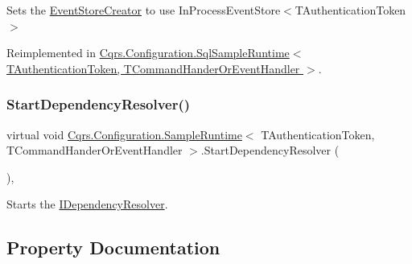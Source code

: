 Sets the \hyperlink{classCqrs_1_1Configuration_1_1SampleRuntime_a9038dd478bcafb2f5f65cbcbada712db_a9038dd478bcafb2f5f65cbcbada712db}{Event\+Store\+Creator} to use In\+Process\+Event\+Store$<$\+T\+Authentication\+Token$>$ 



Reimplemented in \hyperlink{classCqrs_1_1Configuration_1_1SqlSampleRuntime_ae2fedd0697e72a1283a098c809d832c9_ae2fedd0697e72a1283a098c809d832c9}{Cqrs.\+Configuration.\+Sql\+Sample\+Runtime$<$ T\+Authentication\+Token, T\+Command\+Hander\+Or\+Event\+Handler $>$}.

\mbox{\label{classCqrs_1_1Configuration_1_1SampleRuntime_a1593df9e75becc36fee1f15b2be14ec4_a1593df9e75becc36fee1f15b2be14ec4}} 
\subsubsection{\texorpdfstring{Start\+Dependency\+Resolver()}{StartDependencyResolver()}}
{\footnotesize\ttfamily virtual void \hyperlink{classCqrs_1_1Configuration_1_1SampleRuntime}{Cqrs.\+Configuration.\+Sample\+Runtime}$<$ T\+Authentication\+Token, T\+Command\+Hander\+Or\+Event\+Handler $>$.Start\+Dependency\+Resolver (\begin{DoxyParamCaption}{ }\end{DoxyParamCaption})\hspace{0.3cm}{\ttfamily [protected]}, {\ttfamily [virtual]}}



Starts the \hyperlink{interfaceCqrs_1_1Configuration_1_1IDependencyResolver}{I\+Dependency\+Resolver}. 



\subsection{Property Documentation}
\mbox{\label{classCqrs_1_1Configuration_1_1SampleRuntime_a9038dd478bcafb2f5f65cbcbada712db_a9038dd478bcafb2f5f65cbcbada712db}} 
